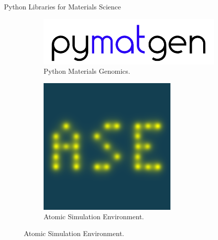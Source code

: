 \documentclass[aspectratio=169]{beamer}
\begin{document}
    \begin{frame}{Python Libraries for Materials Science}
        \begin{figure}
            \centering
            \begin{subfigure}{0.7\textwidth}
                \centering
                \includegraphics[width=\linewidth]{lectures/figures/9_pymatgen.png}
                \caption{Python Materials Genomics.\cite{ongPythonMaterialsGenomics2013}}
            \end{subfigure}
            \begin{subfigure}{0.2\textwidth}
                \centering
                \includegraphics[width=\linewidth]{lectures/figures/9_ASE.png}
                \caption{Atomic Simulation Environment.}
            \end{subfigure}
        \end{figure}
    \end{frame}
\end{document}
